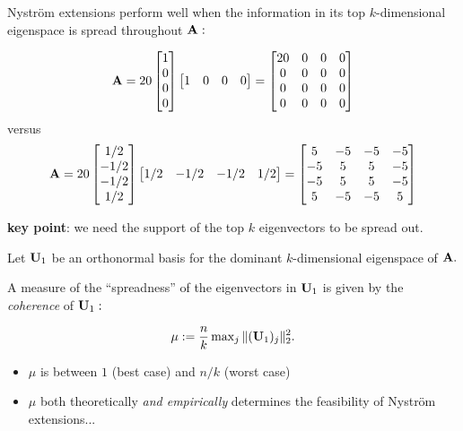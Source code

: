 \documentclass[xcolor=x11names,compress,ignorenonframetext,10pt]{beamer}
\renewcommand{\(}{\begin{columns}}
\renewcommand{\)}{\end{columns}}
\newcommand{\<}[1]{\begin{column}{#1}}
\renewcommand{\>}{\end{column}}
\begin{document}
\begin{frame}
Nystr\"om extensions perform well when 
the information in its top $k$-dimensional eigenspace is spread throughout $\mathbf{A}:$

\[
 \mathbf{A} = 20 \left[\begin{matrix} 1 \\ 0 \\ 0 \\ 0 \end{matrix}\right]
              \left[\begin{matrix} 1 & 0 & 0 & 0 \end{matrix}\right] = \left[\begin{matrix}
  20 & 0 & 0 & 0 \\
  0    & 0 & 0 & 0 \\
  0    & 0 & 0 & 0 \\
  0    & 0 & 0 & 0
 \end{matrix}
 \right]
\]
versus
\[
\mathbf{A} = 20 \left[\begin{matrix} 1/2 \\ -1/2 \\ -1/2 \\ 1/2 \end{matrix}\right]
              \left[\begin{matrix} 1/2 & -1/2 & -1/2 & 1/2 \end{matrix}\right] =              
  \left[\begin{matrix}
                 5 & -5 & -5 & -5 \\
                 -5 & 5 & 5 & -5 \\
                 -5 & 5 & 5 & -5 \\
                  5 & -5 & -5 & 5
                \end{matrix}
  \right]
 \]
 
 \textbf{key point}: we need the support of the top $k$ eigenvectors to be spread out.
 \end{frame}
 
 \begin{frame}

 Let $\mathbf{U}_1$ be an orthonormal basis for the dominant $k$-dimensional eigenspace of $\mathbf{A}.$
 \vspace{0.7em}
 
 A measure of the 
 ``spreadness'' of the eigenvectors in $\mathbf{U}_1$ is given by the \emph{coherence} of $\mathbf{U}_1:$
 
 \[
  \mu := \frac{n}{k} \max\nolimits_j \|(\mathbf{U}_1)_j\|_2^2.
 \]
 
 \begin{itemize}
  \item $\mu$ is between $1$ (best case) and $n/k$ (worst case)
  \item $\mu$ both theoretically \emph{and empirically} determines the feasibility of Nystr\"om extensions...
 \end{itemize}

 \end{frame}
 
\end{document}

